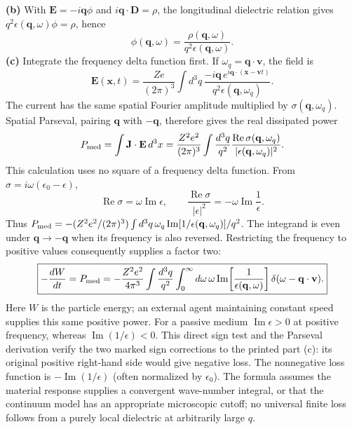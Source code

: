 \textbf{(b)} With $\mathbf E=-i\mathbf q\phi$ and
$i\mathbf q\cdot\mathbf D=\rho$, the longitudinal dielectric
relation gives $q^2\epsilon(\mathbf q,\omega)\phi=\rho$, hence
\[
\boxed{\phi(\mathbf q,\omega)=\frac{\rho(\mathbf q,\omega)}
{q^2\epsilon(\mathbf q,\omega)}.}
\]
\textbf{(c)} Integrate the frequency delta function first. If
$\omega_q=\mathbf q\cdot\mathbf v$, the field is
\[
\mathbf E(\mathbf x,t)=\frac{Ze}{(2\pi)^3}\int d^3q\,
\frac{-i\mathbf q\,e^{i\mathbf q\cdot(\mathbf x-\mathbf vt)}}
{q^2\epsilon(\mathbf q,\omega_q)}.
\]
The current has the same spatial Fourier amplitude multiplied by
$\sigma(\mathbf q,\omega_q)$. Spatial Parseval, pairing $\mathbf q$
with $-\mathbf q$, therefore gives the real dissipated power
\[
P_{\rm med}=\int\mathbf J\cdot\mathbf E\,d^3x
=\frac{Z^2e^2}{(2\pi)^3}\int\frac{d^3q}{q^2}
\frac{\operatorname{Re}\sigma(\mathbf q,\omega_q)}
{|\epsilon(\mathbf q,\omega_q)|^2}.
\]
This calculation uses no square of a frequency delta function.
From $\sigma=i\omega(\epsilon_0-\epsilon)$,
\[
\operatorname{Re}\sigma=\omega\operatorname{Im}\epsilon,
\qquad
\frac{\operatorname{Re}\sigma}{|\epsilon|^2}
=-\omega\operatorname{Im}\frac1\epsilon.
\]
Thus $P_{\rm med}=-(Z^2e^2/(2\pi)^3)\int d^3q\,
\omega_q\operatorname{Im}[1/\epsilon(\mathbf q,\omega_q)]/q^2$.
The integrand is even under $\mathbf q\to-\mathbf q$ when its
frequency is also reversed. Restricting the frequency to positive
values consequently supplies a factor two:
\[
\boxed{-\frac{dW}{dt}=P_{\rm med}
=-\frac{Z^2e^2}{4\pi^3}\int\frac{d^3q}{q^2}\int_0^\infty d\omega\,
\omega\operatorname{Im}\!\left[\frac1{\epsilon(\mathbf q,\omega)}\right]
\delta(\omega-\mathbf q\cdot\mathbf v).}
\]
Here $W$ is the particle energy; an external agent maintaining
constant speed supplies this same positive power. For a passive
medium $\operatorname{Im}\epsilon>0$ at positive frequency, whereas
$\operatorname{Im}(1/\epsilon)<0$. This direct sign test and the
Parseval derivation verify the two marked sign corrections to the
printed part (c): its original positive right-hand side would give
negative loss. The nonnegative loss function is
$-\operatorname{Im}(1/\epsilon)$ (often normalized by $\epsilon_0$).
The formula assumes the material response supplies a convergent
wave-number integral, or that the continuum model has an appropriate
microscopic cutoff; no universal finite loss follows from a purely
local dielectric at arbitrarily large $q$.

